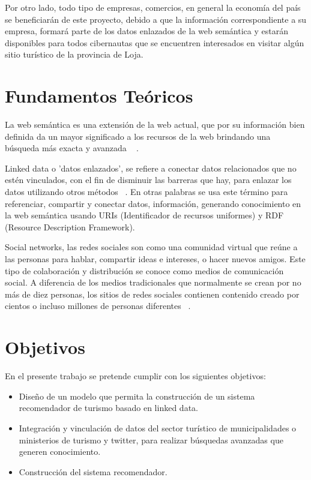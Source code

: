 \documentclass[lnbip,sechang,a4paper]{svmultln}
\begin{document}
Por otro lado, todo tipo de empresas, comercios, en general la economía del país se beneficiarán de este proyecto, debido a que la información correspondiente a su empresa, formará parte de los datos enlazados de la web semántica y estarán disponibles para todos cibernautas que se encuentren interesados en visitar algún sitio turístico de la provincia de Loja. 

\section{Fundamentos Teóricos}

La web semántica es una extensión de la web actual, que por su información bien definida da un mayor significado a los recursos de la web brindando una búsqueda más exacta y avanzada ~\cite{siete} .

Linked data o 'datos enlazados', se refiere a conectar datos relacionados que no estén vinculados, con el fin de disminuir las barreras que hay, para enlazar los datos utilizando otros métodos ~\cite{tres}. En otras palabras se usa este término para referenciar, compartir y conectar datos, información, generando conocimiento en la web semántica usando URIs (Identificador de recursos uniformes) y RDF (Resource Description Framework).

Social networks, las redes sociales son como una comunidad virtual  que reúne a las personas para hablar, compartir ideas e intereses, o hacer nuevos amigos. Este tipo de colaboración y distribución se conoce como medios de comunicación social. A diferencia de los medios tradicionales que normalmente se crean por no más de diez personas, los sitios de redes sociales contienen contenido creado por cientos o incluso millones de personas diferentes ~\cite{pcuatro}.


\section{Objetivos}

En el presente trabajo se pretende cumplir con los siguientes objetivos:

\begin{itemize}
    \item Diseño de un modelo que permita la construcción de un sistema recomendador de turismo  basado en linked data.
    \item Integración y vinculación de datos del sector turístico de municipalidades o ministerios de turismo y twitter, para realizar búsquedas avanzadas que generen conocimiento.
    \item Construcción del sistema recomendador.
\end{itemize}
\end{document}

